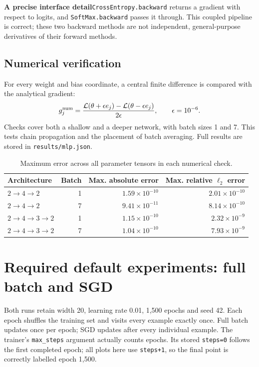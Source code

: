 \documentclass[10pt,a4paper]{article}
\newcommand{\finding}[2]{\begin{tcolorbox}\textbf{\textcolor{clay}{#1}}\quad #2\end{tcolorbox}}
\newcommand{\code}[1]{\texttt{\small #1}}
\begin{document}
\finding{A precise interface detail}{\code{CrossEntropy.backward} returns a gradient with
respect to logits, and \code{SoftMax.backward} passes it through. This coupled
pipeline is correct; these two backward methods are not independent,
general-purpose derivatives of their forward methods.}

\subsection{Numerical verification}
For every weight and bias coordinate, a central finite difference is compared
with the analytical gradient:
\[
g_j^{\rm num}=\frac{\mathcal L(\theta+\epsilon e_j)-\mathcal L(\theta-\epsilon e_j)}{2\epsilon},
\qquad \epsilon=10^{-6}.
\]
Checks cover both a shallow and a deeper network, with batch sizes 1 and 7.
This tests chain propagation and the placement of batch averaging. Full
results are stored in \code{results/mlp.json}.
\begin{table}[H]\small\centering
\caption{Maximum error across all parameter tensors in each numerical check.}
\begin{tabular}{@{}lrrr@{}}\toprule
Architecture & Batch & Max. absolute error & Max. relative $\ell_2$ error\\\midrule
$2\to4\to2$ & 1 & $1.59\times 10^{-10}$ & $2.01\times 10^{-10}$\\
$2\to4\to2$ & 7 & $9.41\times 10^{-11}$ & $8.14\times 10^{-10}$\\
$2\to4\to3\to2$ & 1 & $1.15\times 10^{-10}$ & $2.32\times 10^{-9}$\\
$2\to4\to3\to2$ & 7 & $1.04\times 10^{-10}$ & $7.93\times 10^{-9}$\\
\bottomrule\end{tabular}\end{table}

\clearpage
\section{Required default experiments: full batch and SGD}
Both runs retain width 20, learning rate 0.01, 1,500 epochs and seed 42.
Each epoch shuffles the training set and visits every example exactly once.
Full batch updates once per epoch; SGD updates after every individual example.
The trainer's \code{max\_steps} argument actually counts epochs. Its stored
\code{steps=0} follows the first completed epoch; all plots here use
\code{steps+1}, so the final point is correctly labelled epoch 1,500.
\end{document}

